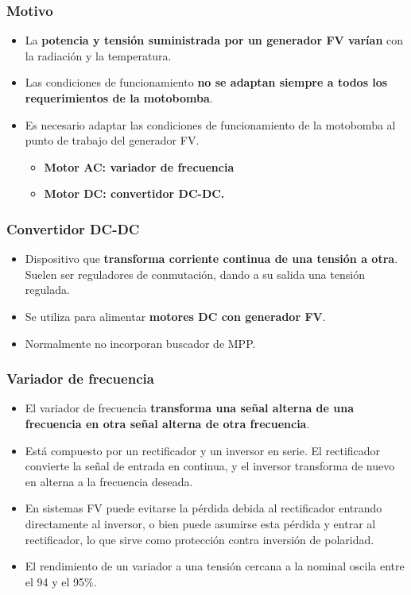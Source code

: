 \documentclass[serif, xcolor=dvipsnames]{beamer}
\begin{document}
\begin{frame}
\frametitle{Motivo}
\begin{itemize}
\item La \textbf{potencia y tensión suministrada por un generador FV varían}
con la radiación y la temperatura.
\item Las condiciones de funcionamiento \textbf{no se adaptan siempre a
todos los requerimientos de la motobomba}.
\item Es necesario adaptar las condiciones de funcionamiento de la motobomba
al punto de trabajo del generador FV.

\begin{itemize}
\item \textbf{Motor AC: variador de frecuencia}
\item \textbf{Motor DC: convertidor DC-DC.}
\end{itemize}
\end{itemize}

\end{frame}

\begin{frame}
\frametitle{Convertidor DC-DC}
\begin{itemize}
\item Dispositivo que \textbf{transforma corriente continua de una tensión
a otra}. Suelen ser reguladores de conmutación, dando a su salida
una tensión regulada.
\item Se utiliza para alimentar \textbf{motores DC con generador FV}.
\item Normalmente no incorporan buscador de MPP.
\end{itemize}

\end{frame}

\begin{frame}
\frametitle{Variador de frecuencia}
\begin{itemize}
\item El variador de frecuencia\textbf{ transforma una señal alterna de
una frecuencia en otra señal alterna de otra frecuencia}. 
\item Está compuesto por un rectificador y un inversor en serie. El rectificador
convierte la señal de entrada en continua, y el inversor transforma
de nuevo en alterna a la frecuencia deseada.
\item En sistemas FV puede evitarse la pérdida debida al rectificador entrando
directamente al inversor, o bien puede asumirse esta pérdida y entrar
al rectificador, lo que sirve como protección contra inversión de
polaridad. 
\item El rendimiento de un variador a una tensión cercana a la nominal oscila
entre el 94 y el 95\%. 
\end{itemize}

\end{frame}
\end{document}
